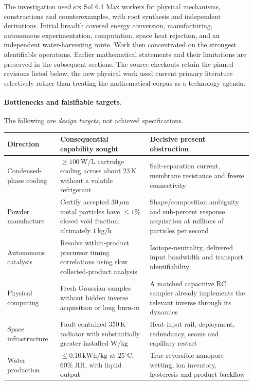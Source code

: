 \documentclass[11pt]{article}
\begin{document}
The investigation used six Sol 6.1 Max workers for physical mechanisms, constructions and counterexamples, with root synthesis and independent derivations. Initial breadth covered energy conversion, manufacturing, autonomous experimentation, computation, space heat rejection, and an independent water-harvesting route. Work then concentrated on the strongest identifiable operations. Earlier mathematical statements and their limitations are preserved in the subsequent sections. The source checkouts retain the pinned revisions listed below; the new physical work used current primary literature selectively rather than treating the mathematical corpus as a technology agenda.

\paragraph{Bottlenecks and falsifiable targets.}
The following are \emph{design targets}, not achieved specifications.
\begin{center}\small
\begin{tabular}{p{.17\linewidth}p{.35\linewidth}p{.38\linewidth}}
Direction & Consequential capability sought & Decisive present obstruction \\\hline
Condensed-phase cooling & $\ge100\,\mathrm{W/L}$ cartridge cooling across about $23\,\mathrm K$ without a volatile refrigerant & Salt-separation current, membrane resistance and freeze connectivity \\
Powder manufacture & Certify accepted $30\,\mu\mathrm m$ metal particles have $\le1\%$ closed void fraction; ultimately $1\,\mathrm{kg/h}$ & Shape/composition ambiguity and sub-percent response acquisition at millions of particles per second \\
Autonomous catalysis & Resolve within-product precursor timing correlations using slow collected-product analysis & Isotope-neutrality, delivered input bandwidth and transport identifiability \\
Physical computing & Fresh Gaussian samples without hidden inverse acquisition or long burn-in & A matched capacitive RC sampler already implements the relevant inverse through its dynamics \\
Space infrastructure & Fault-contained $350\,\mathrm K$ radiator with substantially greater installed $\mathrm{W/kg}$ & Heat-input rail, deployment, redundancy, seams and capillary restart \\
Water production & $\le0.10\,\mathrm{kWh/kg}$ at $25^\circ\mathrm C$, $60\%$ RH, with liquid output & True reversible nanopore wetting, ion inventory, hysteresis and product backflow
\end{tabular}
\end{center}
\end{document}
